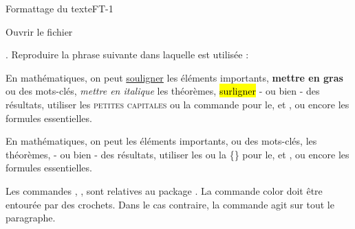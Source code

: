 \begin{EXO}{Formattage du texte}{FT-1}
    \begin{tcbenumerate}
        \tcbitem Ouvrir le fichier 
        
        .
        \tcbitem {}Reproduire la phrase suivante dans laquelle  est utilisée  : 

        \begin{center}
            En mathématiques, on peut \underline{souligner} les éléments importants, 
            \textbf{mettre en gras} ou  des mots-clés, 
            \emph{mettre en italique} les théorèmes, 
            \hl{surligner} - ou bien  - des résultats, 
            utiliser les \textsc{petites capitales} ou la {\color{green!75!black}commande}  pour le, 
            et , ou encore  les formules essentielles.
        \end{center}

    \end{tcbenumerate}
    
\exocorrection

En mathématiques, on peut  les éléments importants, 
 ou  des mots-clés, 
 les théorèmes, 
 - ou bien  - des résultats, 
utiliser les  ou la \{\}  pour le, 
et , ou encore  les formules essentielles.

\begin{Remarque}
\begin{tcbenumerate}
    \tcbitem  Les commandes , ,  sont relatives au package \bfcours.
    \tcbitem  La commande color doit être entourée par des crochets. Dans le cas contraire, la commande agit sur tout le paragraphe. 
\end{tcbenumerate}
\end{Remarque}
\end{EXO}

